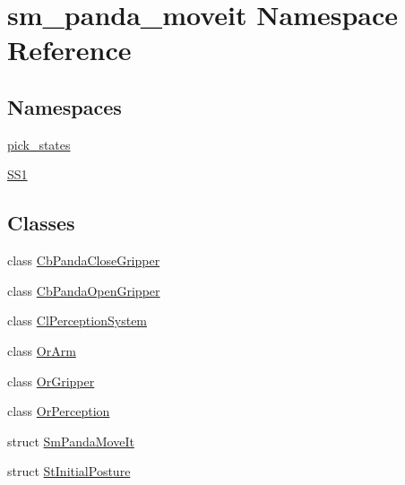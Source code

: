 \hypertarget{namespacesm__panda__moveit}{}\section{sm\+\_\+panda\+\_\+moveit Namespace Reference}
\label{namespacesm__panda__moveit}
\subsection*{Namespaces}
\begin{DoxyCompactItemize}
\item 
 \hyperlink{namespacesm__panda__moveit_1_1pick__states}{pick\+\_\+states}
\item 
 \hyperlink{namespacesm__panda__moveit_1_1SS1}{S\+S1}
\end{DoxyCompactItemize}
\subsection*{Classes}
\begin{DoxyCompactItemize}
\item 
class \hyperlink{classsm__panda__moveit_1_1CbPandaCloseGripper}{Cb\+Panda\+Close\+Gripper}
\item 
class \hyperlink{classsm__panda__moveit_1_1CbPandaOpenGripper}{Cb\+Panda\+Open\+Gripper}
\item 
class \hyperlink{classsm__panda__moveit_1_1ClPerceptionSystem}{Cl\+Perception\+System}
\item 
class \hyperlink{classsm__panda__moveit_1_1OrArm}{Or\+Arm}
\item 
class \hyperlink{classsm__panda__moveit_1_1OrGripper}{Or\+Gripper}
\item 
class \hyperlink{classsm__panda__moveit_1_1OrPerception}{Or\+Perception}
\item 
struct \hyperlink{structsm__panda__moveit_1_1SmPandaMoveIt}{Sm\+Panda\+Move\+It}
\item 
struct \hyperlink{structsm__panda__moveit_1_1StInitialPosture}{St\+Initial\+Posture}
\end{DoxyCompactItemize}
